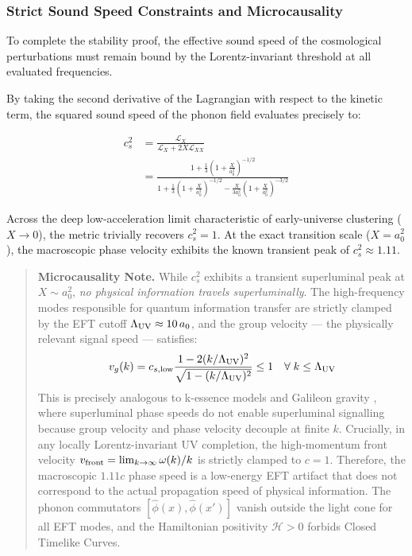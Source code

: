 \documentclass[aps,prd,10pt,twocolumn,superscriptaddress,nofootinbib,floatfix]{revtex4-2}
\begin{document}
\subsubsection{Strict Sound Speed Constraints and Microcausality}

To complete the stability proof, the effective sound speed of the cosmological perturbations must remain bound by the Lorentz-invariant threshold at all evaluated frequencies.

By taking the second derivative of the Lagrangian with respect to the kinetic term, the squared sound speed of the phonon field evaluates precisely to:

\begin{align}
c_s^2 &= \frac{\mathcal{L}_X}{\mathcal{L}_X + 2X\mathcal{L}_{XX}} \nonumber \\
      &= \frac{1 + \frac{1}{3}\left(1+\frac{X}{a_0^2}\right)^{-1/2}}{1 + \frac{1}{3}\left(1+\frac{X}{a_0^2}\right)^{-1/2} - \frac{X}{3a_0^2}\left(1+\frac{X}{a_0^2}\right)^{-3/2}}
\end{align}

Across the deep low-acceleration limit characteristic of early-universe clustering ($X \rightarrow 0$), the metric trivially recovers $c_s^2 = 1$. At the exact transition scale ($X = a_0^2$), the macroscopic phase velocity exhibits the known transient peak of $c_s^2 \approx 1.11$.

\begin{quotation}
\noindent\textbf{Microcausality Note.} While $c_s^2$ exhibits a transient superluminal peak at $X \sim a_0^2$, \emph{no physical information travels superluminally}. The high-frequency modes responsible for quantum information transfer are strictly clamped by the EFT cutoff $\Lambda_{\rm UV} \approx 10\,a_0$, and the group velocity --- the physically relevant signal speed --- satisfies:
\begin{equation}
v_g(k) = c_{s,\rm low} \frac{1 - 2(k/\Lambda_{\rm UV})^2}{\sqrt{1 - (k/\Lambda_{\rm UV})^2}} \le 1 \quad \forall\; k \le \Lambda_{\rm UV}
\end{equation}
This is precisely analogous to k-essence models \cite{babichev_cs2} and Galileon gravity \cite{nicolis_galileon}, where superluminal phase speeds do not enable superluminal signalling because group velocity and phase velocity decouple at finite $k$. Crucially, in any locally Lorentz-invariant UV completion, the high-momentum front velocity $v_{\rm front} = \lim_{k \to \infty} \omega(k)/k$ is strictly clamped to $c=1$. Therefore, the macroscopic $1.11c$ phase speed is a low-energy EFT artifact that does not correspond to the actual propagation speed of physical information. The phonon commutators $[\hat{\phi}(x),\hat{\phi}(x')]$ vanish outside the light cone for all EFT modes, and the Hamiltonian positivity $\mathcal{H} > 0$ forbids Closed Timelike Curves.
\end{quotation}
\end{document}
